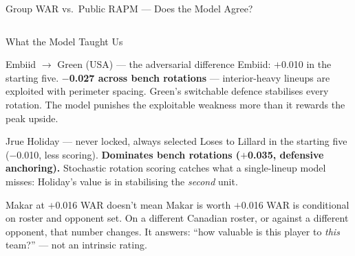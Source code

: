 \documentclass[aspectratio=169,11pt]{beamer}
\newcommand{\good}[1]{\textcolor{bgrn}{\textbf{#1}}}
\newcommand{\bad}[1]{\textcolor{bred}{\textbf{#1}}}
\begin{document}
\begin{frame}[shrink=10]{Group WAR vs.\ Public RAPM — Does the Model Agree?}
\begin{columns}[T]
\end{columns}
\end{frame}

\begin{frame}{What the Model Taught Us}
\begin{exampleblock}{Embiid $\to$ Green (USA) — the adversarial difference}
  \small Embiid: $+$0.010 in the starting five. \bad{$-$0.027 across bench rotations} — interior-heavy lineups are exploited with perimeter spacing.
  Green's switchable defence stabilises every rotation. The model punishes the exploitable weakness more than it rewards the peak upside.
\end{exampleblock}
\vspace{0.3em}
\begin{exampleblock}{Jrue Holiday — never locked, always selected}
  \small Loses to Lillard in the starting five ($-$0.010, less scoring). \good{Dominates bench rotations ($+$0.035, defensive anchoring).}
  Stochastic rotation scoring catches what a single-lineup model misses: Holiday's value is in stabilising the \textit{second} unit.
\end{exampleblock}
\vspace{0.3em}
\begin{block}{Makar at $+$0.016 WAR doesn't mean Makar is worth $+$0.016}
  \small WAR is conditional on roster and opponent set. On a different Canadian roster, or against a different opponent, that number changes. It answers: ``how valuable is this player to \textit{this} team?'' — not an intrinsic rating.
\end{block}
\end{frame}
\end{document}
